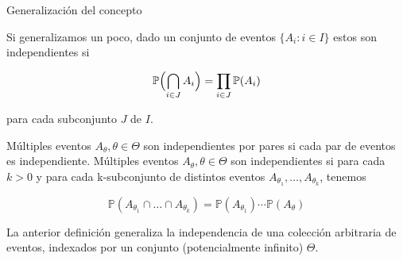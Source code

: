 \documentclass[10pt]{beamer}
\begin{document}
\begin{frame}{Generalizaci\'on del concepto }	
\small{Si generalizamos un poco, dado un conjunto  de eventos $\{ A_i: i \in I \}$ estos  son independientes si
	
\[
	\mathbb{P}\Bigl(  \bigcap\limits_{i \in J}A_i \Bigr)  = \prod_{i \in J}\mathbb{P}(A_i)  
\]
	
para cada subconjunto $J$ de $I$.

\vspace{0.2cm}


 M\'ultiples eventos $A_{\theta}, \theta \in \Theta$ son independientes por pares si cada par de eventos es independiente.  M\'ultiples eventos $A_{\theta}, \theta \in \Theta$ son independientes si para cada $k > 0$ y para cada k-subconjunto de distintos eventos $A_{\theta_1},\ldots,A_{\theta_k}$, tenemos}
	
	\[
	\mathbb{P}(A_{\theta_1}\cap\ldots\cap A_{\theta_k})=\mathbb{P}(A_{\theta_1})\cdots \mathbb{P}(A_{\theta})
	\]

\vspace{0.2cm}

\scriptsize{La anterior definici\'on generaliza la independencia de una colecci\'on arbitraria de eventos, indexados por un conjunto (potencialmente infinito) $\Theta$.}
\end{frame}
\end{document}
